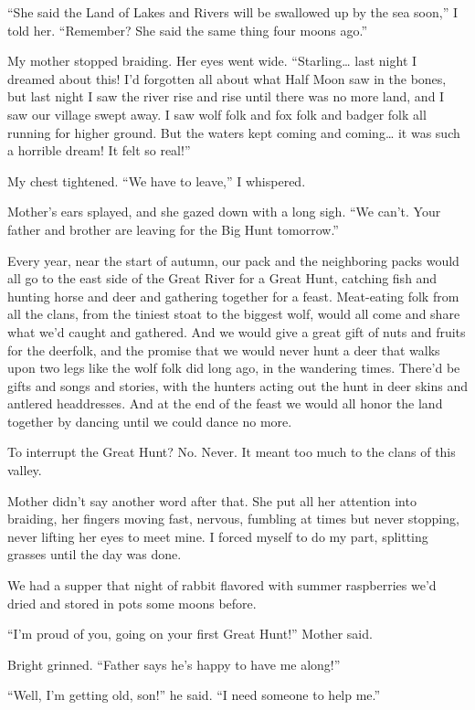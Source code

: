 ``She said the Land of Lakes and Rivers will be swallowed up by the sea soon,'' I told her. ``Remember? She said the same thing four moons ago.''

My mother stopped braiding. Her eyes went wide. ``Starling\ldots{} last night I dreamed about this! I'd forgotten all about what Half Moon saw in the bones, but last night I saw the river rise and rise until there was no more land, and I saw our village swept away. I saw wolf folk and fox folk and badger folk all running for higher ground. But the waters kept coming and coming\ldots{} it was such a horrible dream! It felt so real!''

My chest tightened. ``We have to leave,'' I whispered.

Mother's ears splayed, and she gazed down with a long sigh. ``We can't. Your father and brother are leaving for the Big Hunt tomorrow.''

Every year, near the start of autumn, our pack and the neighboring packs would all go to the east side of the Great River for a Great Hunt, catching fish and hunting horse and deer and gathering together for a feast. Meat-eating folk from all the clans, from the tiniest stoat to the biggest wolf, would all come and share what we'd caught and gathered. And we would give a great gift of nuts and fruits for the deerfolk, and the promise that we would never hunt a deer that walks upon two legs like the wolf folk did long ago, in the wandering times. There'd be gifts and songs and stories, with the hunters acting out the hunt in deer skins and antlered headdresses. And at the end of the feast we would all honor the land together by dancing until we could dance no more.

To interrupt the Great Hunt? No. Never. It meant too much to the clans of this valley.

Mother didn't say another word after that. She put all her attention into braiding, her fingers moving fast, nervous, fumbling at times but never stopping, never lifting her eyes to meet mine. I forced myself to do my part, splitting grasses until the day was done.

We had a supper that night of rabbit flavored with summer raspberries we'd dried and stored in pots some moons before.

``I'm proud of you, going on your first Great Hunt!'' Mother said.

Bright grinned. ``Father says he's happy to have me along!''

``Well, I'm getting old, son!'' he said. ``I need someone to help me.''

